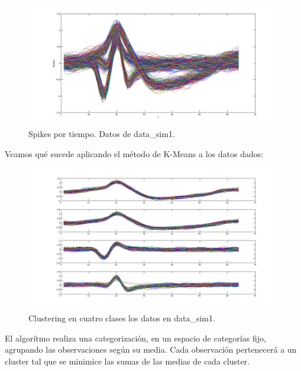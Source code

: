 \documentclass[a4paper,spanish]{article}
\begin{document}
\begin{figure}[htc]
	\centering
	\includegraphics[width=1.0\textwidth]{imgs/spikes_data_1.png}
	\caption{Spikes por tiempo. Datos de data\_sim1.}
	\label{fig1}
\end{figure}






Veamos qu\'e sucede aplicando el m\'etodo de K-Means a los datos dados:

\begin{figure}[htc]
	\centering
	\includegraphics[width=1.0\textwidth]{imgs/clustering_4_data_1.png}
	\caption{Clustering en cuatro clases los datos en data\_sim1.}
	\label{fig2}
\end{figure}


El algor\'itmo realiza una categorizaci\'on, en un espacio de categor\'ias fijo, agrupando las observaciones seg\'un su media. Cada observaci\'on pertenecer\'a a un cluster tal que se minimice las sumas de las medias de cada cluster.
\end{document}
